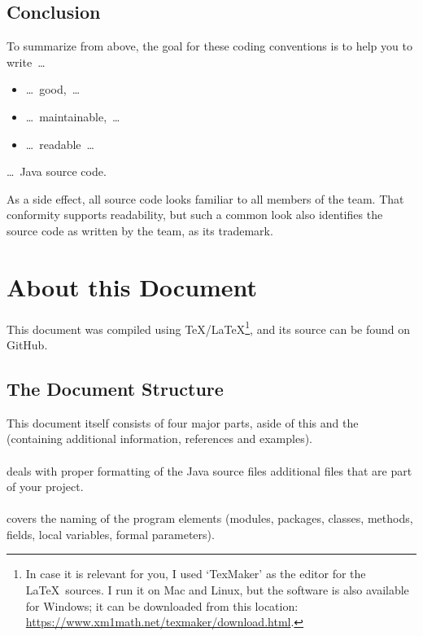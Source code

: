 \documentclass[11pt,a4paper, titlepage, parskip=half, headsepline, footsepline, cleardoublepage=current, headheight=1cm]{scrbook}
\begin{document}
\subsection{Conclusion}
To summarize from above, the goal for these coding conventions is to help you to write~…
\begin{itemize}[nosep]
	\item …~good,~…
	\item …~maintainable,~…
	\item …~readable~…
\end{itemize}
…~Java source code.

As a side effect, all source code looks familiar to all members of the team. That conformity supports readability, but such a common look also identifies the source code as written by the team, as its trademark.

\section{About this Document}
This document was compiled using \TeX/\LaTeX\footnote{In case it is relevant for you, I used ‘TexMaker’ as the editor for the \LaTeX~sources. I run it on Mac and Linux, but the software is also available for Windows; it can be downloaded from this location: \url{https://www.xm1math.net/texmaker/download.html}.}, and its source can be found on GitHub\autocite{TQUADRAT_ORG_DOCUMENT_REPOSITORY}.

\subsection{The Document Structure}
This document itself consists of four major parts, aside of this  and the  (containing additional information, references and examples).

\paragraph{} deals with proper formatting of the Java source files additional files that are part of your project.

\paragraph{} covers the naming of the program elements (modules, packages, classes, methods, fields, local variables, formal parameters).
\end{document}
